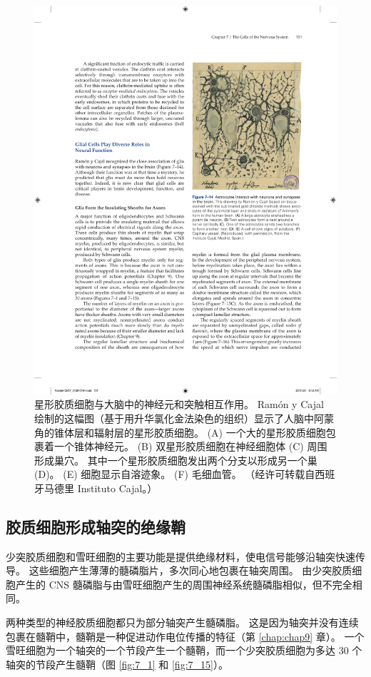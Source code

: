 \begin{figure}[htbp]
	\centering
	\includegraphics[width=0.5\linewidth]{chap07/fig_7_14}
	\caption{星形胶质细胞与大脑中的神经元和突触相互作用。 Ramón y Cajal 绘制的这幅图（基于用升华氯化金法染色的组织）显示了人脑中阿蒙角的锥体层和辐射层的星形胶质细胞。 (A) 一个大的星形胶质细胞包裹着一个锥体神经元。 (B) 双星形胶质细胞在神经细胞体 (C) 周围形成巢穴。 其中一个星形胶质细胞发出两个分支以形成另一个巢 (D)。 (E) 细胞显示自溶迹象。 (F) 毛细血管。 （经许可转载自西班牙马德里 Instituto Cajal。）}
	\label{fig:7_14}
\end{figure}


\subsection{胶质细胞形成轴突的绝缘鞘}
少突胶质细胞和雪旺细胞的主要功能是提供绝缘材料，使电信号能够沿轴突快速传导。 
这些细胞产生薄薄的髓磷脂片，多次同心地包裹在轴突周围。 
由少突胶质细胞产生的 CNS 髓磷脂与由雪旺细胞产生的周围神经系统髓磷脂相似，但不完全相同。


两种类型的神经胶质细胞都只为部分轴突产生髓磷脂。 
这是因为轴突并没有连续包裹在髓鞘中，髓鞘是一种促进动作电位传播的特征（第 \ref{chap:chap9} 章）。 
一个雪旺细胞为一个轴突的一个节段产生一个髓鞘，而一个少突胶质细胞为多达 30 个轴突的节段产生髓鞘（图 \ref{fig:7_1} 和 \ref{fig:7_15}）。

